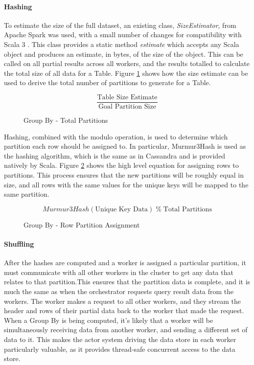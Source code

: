 \paragraph{Hashing} To estimate the size of the full dataset, an existing class, \textit{SizeEstimator}, from Apache Spark was used, with a small number of changes for compatibility with Scala 3 . This class provides a static method \textit{estimate} which accepts any Scala object and produces an estimate, in bytes, of the size of the object. This can be called on all partial results across all workers, and the results totalled to calculate the total size of all data for a Table. Figure \ref{fig:group-by-num-partitions} shows how the size estimate can be used to derive the total number of partitions to generate for a Table.

\begin{figure}[h]
	\centering
	\[ \frac{\text{Table Size Estimate}}{\text{Goal Partition Size}} \]
	\caption{Group By - Total Partitions}
	\label{fig:group-by-num-partitions}
\end{figure}

Hashing, combined with the modulo operation, is used to determine which partition each row should be assigned to. In particular, Murmur3Hash is used as the hashing algorithm, which is the same as in Cassandra and is provided natively by Scala. Figure \ref{fig:group-by-partition-assign} shows the high level equation for assigning rows to partitions. This process ensures that the new partitions will be roughly equal in size, and all rows with the same values for the unique keys will be mapped to the same partition.

\begin{figure}[h]
	\centering
	\[ Murmur3Hash(\text{Unique Key Data}) \; \%  \; \text{Total Partitions} \]
	\caption{Group By - Row Partition Assignment}
	\label{fig:group-by-partition-assign}
\end{figure} 

\paragraph{Shuffling}
After the hashes are computed and a worker is assigned a particular partition, it must communicate with all other workers in the cluster to get any data that relates to that partition.This ensures that the partition data is complete, and it is much the same as when the orchestrator requests query result data from the workers. The worker makes a request to all other workers, and they stream the header and rows of their partial data back to the worker that made the request. When a Group By is being computed, it's likely that a worker will be simultaneously receiving data from another worker, and sending a different set of data to it. This makes the actor system driving the data store in each worker particularly valuable, as it provides thread-safe concurrent access to the data store.


